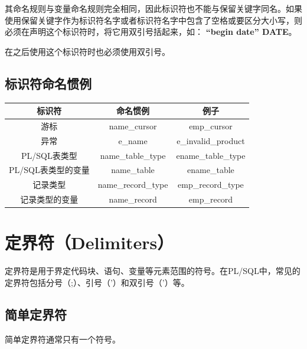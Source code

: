 \documentclass[11pt, a4paper, oneside, UTF8]{ctexbook}
\let\kaishu\relax %
\begin{document}
其命名规则与变量命名规则完全相同，因此标识符也不能与保留关键字同名。如果使用保留关键字作为标识符名字或者标识符名字中包含了空格或要区分大小写，则必须在声明这个标识符时，将它用双引号括起来，如：  {\bfseries\kaishu “begin date” DATE}。

在之后使用这个标识符时也必须使用双引号。

\subsection{标识符命名惯例}

\begin{center}
  \begin{minipage}{\textwidth}
    \centering %
    \begin{tabular}{|c|c|c|} %
      \hline %
      \textbf{标识符} & \textbf{命名惯例}  & \textbf{例子} \\
      \hline
      游标 & name\_cursor & emp\_cursor \\
      异常 & e\_name & e\_invalid\_product \\
      PL/SQL表类型 & name\_table\_type & ename\_table\_type \\
      PL/SQL表类型的变量 & name\_table  & ename\_table \\
      记录类型 & name\_record\_type & emp\_record\_type \\
      记录类型的变量 & name\_record & emp\_record \\
      \hline
    \end{tabular}
    \captionsetup{hypcap=false}
    \label{tab:标识符命名惯例} %
  \end{minipage}
\end{center}

\section{定界符（Delimiters）}
定界符是用于界定代码块、语句、变量等元素范围的符号。在PL/SQL中，常见的定界符包括分号（;）、引号（'）和双引号（'）等。
\subsection{简单定界符}
简单定界符通常只有一个符号。
\end{document}
